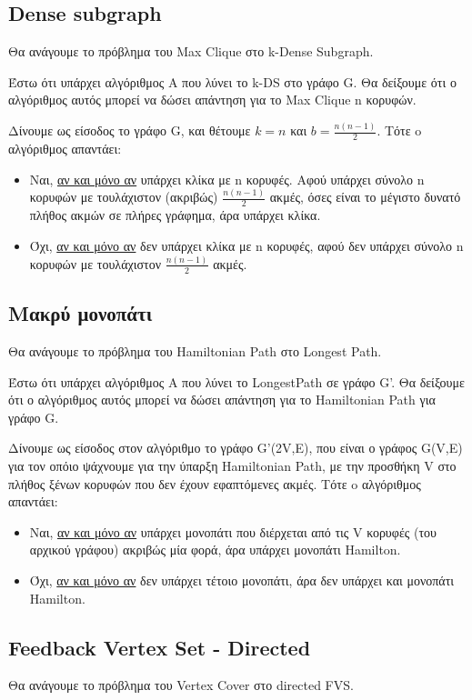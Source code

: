 \documentclass[a4paper,11pt]{article}
\begin{document}
\subsection{Dense subgraph}
Θα ανάγουμε το πρόβλημα του Max Clique στο k-Dense Subgraph.

Έστω ότι υπάρχει αλγόριθμος Α που λύνει το k-DS στο γράφο G.
Θα δείξουμε ότι ο αλγόριθμος αυτός μπορεί να δώσει απάντηση για το Max Clique
n κορυφών.

Δίνουμε ως είσοδος το γράφο G, και θέτουμε $k = n$ και $b = \frac{n(n-1)}{2}$.
Τότε o αλγόριθμος απαντάει:
\begin{itemize}
\item Ναι, \underline{αν και μόνο αν} υπάρχει κλίκα με n κορυφές. Αφού υπάρχει
σύνολο n κορυφών με τουλάχιστον (ακριβώς) $\frac{n(n-1)}{2}$ ακμές, όσες είναι
το μέγιστο δυνατό πλήθος ακμών σε πλήρες γράφημα, άρα υπάρχει κλίκα.
\item Όχι, \underline{αν και μόνο αν} δεν υπάρχει κλίκα με n κορυφές, αφού δεν
υπάρχει σύνολο n κορυφών με τουλάχιστον $\frac{n(n-1)}{2}$ ακμές.
\end{itemize}

\subsection{Μακρύ μονοπάτι}
Θα ανάγουμε το πρόβλημα του Hamiltonian Path στο Longest Path.

Έστω ότι υπάρχει αλγόριθμος Α που λύνει το LongestPath σε γράφο G'.
Θα δείξουμε ότι ο αλγόριθμος αυτός μπορεί να δώσει απάντηση για το Hamiltonian
Path για γράφο G.

Δίνουμε ως είσοδος στον αλγόριθμο το γράφο G'(2V,E), που είναι ο γράφος G(V,E)
για τον οπόιο ψάχνουμε για την ύπαρξη Hamiltonian Path, με την προσθήκη V στο
πλήθος ξένων κορυφών που δεν έχουν εφαπτόμενες ακμές.
Τότε o αλγόριθμος απαντάει:
\begin{itemize}
\item Ναι, \underline{αν και μόνο αν} υπάρχει μονοπάτι που διέρχεται από τις V
κορυφές (του αρχικού γράφου) ακριβώς μία φορά, άρα υπάρχει μονοπάτι Hamilton.
\item Όχι, \underline{αν και μόνο αν} δεν υπάρχει τέτοιο μονοπάτι, άρα δεν
υπάρχει και μονοπάτι Hamilton.
\end{itemize}

\subsection{Feedback Vertex Set - Directed}
Θα ανάγουμε το πρόβλημα του Vertex Cover στο directed FVS.
\end{document}
